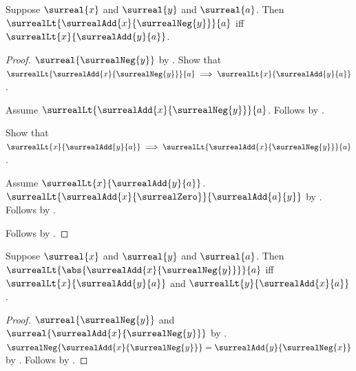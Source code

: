 \begin{proposition}\label{surreal_difference_lt_iff}
    Suppose $\surreal{x}$ and $\surreal{y}$ and $\surreal{a}$.
    Then
        $\surrealLt{\surrealAdd{x}{\surrealNeg{y}}}{a}$ iff
        $\surrealLt{x}{\surrealAdd{y}{a}}$.
\end{proposition}
\begin{proof}
    $\surreal{\surrealNeg{y}}$
        by .
    Show that
        $\surrealLt{\surrealAdd{x}{\surrealNeg{y}}}{a}
            \implies
         \surrealLt{x}{\surrealAdd{y}{a}}$.
    \begin{subproof}
        Assume
            $\surrealLt{\surrealAdd{x}{\surrealNeg{y}}}{a}$.
        Follows by
            .
    \end{subproof}
    Show that
        $\surrealLt{x}{\surrealAdd{y}{a}}
            \implies
         \surrealLt{\surrealAdd{x}{\surrealNeg{y}}}{a}$.
    \begin{subproof}
        Assume $\surrealLt{x}{\surrealAdd{y}{a}}$.
        $\surrealLt{\surrealAdd{x}{\surrealZero}}
            {\surrealAdd{a}{y}}$
            by .
        Follows by
            .
    \end{subproof}
    Follows by \auto.
\end{proof}

\begin{theorem}\label{surreal_abs_difference_lt_iff}
    Suppose $\surreal{x}$ and $\surreal{y}$ and $\surreal{a}$.
    Then
        $\surrealLt{\abs{\surrealAdd{x}{\surrealNeg{y}}}}{a}$ iff
        $\surrealLt{x}{\surrealAdd{y}{a}}$ and
        $\surrealLt{y}{\surrealAdd{x}{a}}$.
\end{theorem}
\begin{proof}
    $\surreal{\surrealNeg{y}}$ and
        $\surreal{\surrealAdd{x}{\surrealNeg{y}}}$
        by
        .
    $\surrealNeg{\surrealAdd{x}{\surrealNeg{y}}}
        =\surrealAdd{y}{\surrealNeg{x}}$
        by .
    Follows by
        .
\end{proof}

